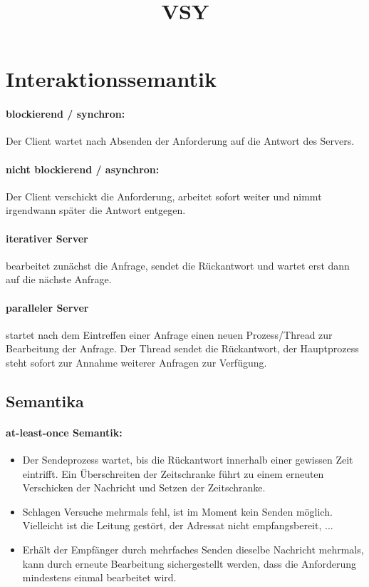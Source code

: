\documentclass[a4paper]{article}
\title{VSY}
\date{}
\begin{document}
\maketitle
\tableofcontents
\pagebreak
\section{Interaktionssemantik}
	\paragraph{\textbf{blockierend / synchron:}}Der Client wartet nach Absenden der Anforderung auf die Antwort des Servers.
	\paragraph{\textbf{nicht blockierend / asynchron:}}Der Client verschickt die Anforderung, arbeitet sofort weiter und nimmt irgendwann später die Antwort entgegen.
	\paragraph{iterativer Server} bearbeitet zunächst die Anfrage, sendet die Rückantwort und wartet erst dann auf die nächste Anfrage.
	\paragraph{paralleler Server}startet nach dem Eintreffen einer Anfrage einen neuen Prozess/Thread zur Bearbeitung der Anfrage. Der Thread sendet die Rückantwort, der Hauptprozess steht sofort zur Annahme weiterer Anfragen zur Verfügung.
	\subsection{Semantika}
		\paragraph{\textbf{at-least-once Semantik:}}
			\begin{itemize}
				\item Der Sendeprozess wartet, bis die Rückantwort innerhalb einer gewissen Zeit eintrifft. Ein Überschreiten der Zeitschranke führt zu einem erneuten Verschicken der Nachricht und Setzen der Zeitschranke.
				\item Schlagen Versuche mehrmals fehl, ist im Moment kein Senden möglich. Vielleicht ist die Leitung gestört, der Adressat nicht empfangsbereit, ...
				\item Erhält der Empfänger durch mehrfaches Senden dieselbe Nachricht mehrmals, kann durch erneute Bearbeitung sichergestellt werden, dass die Anforderung mindestens einmal bearbeitet wird.
			\end{itemize}
\end{document}
